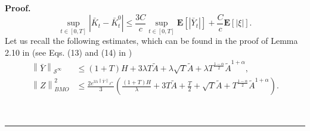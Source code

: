 \documentclass[10pt]{article}%
\numberwithin{equation}{section}
\newenvironment{proof}[1][Proof]{\noindent \textbf{#1.} }{\  \rule{0.5em}{0.5em}}
\def \E{\mathbf{E}}
\begin{document}
\begin{proof}
\begin{equation}
	\sup_{t \in[0, T]}\left|\bar{K}_{t}-\bar{K}^0_{t}\right|
	\leq \frac{3C}{c}\sup_{t \in[0, T]}\mathbf{E}[|\bar{Y}_t|]+\frac{C}{c}\E[|\xi|].
\end{equation}
Let us recall the following estimates, which can be found in the proof of Lemma 2.10 in \cite{LP} (see Eqs. (13) and (14) in \cite{LP})  
\begin{equation}\label{barYZ}\begin{split}
\left\|\bar{Y}\right\|_{\mathcal{S}^{\infty}}%
&\leq (1+T)H+3\lambda T \tilde{A}+\lambda\sqrt{T} \tilde{A}+\lambda T^{\frac{1-\alpha}{2}} \tilde{A}^{1+\alpha},\\
\left\|Z\right\|_{BMO}^2%
&\leq \frac{2 e^{3\lambda\left\|\bar{Y}\right\|_{\mathcal{S}^{\infty}}}}{3}\left(\frac{(1+T)H}{\lambda}+3 T \tilde{A}+\frac{T}{2} +\sqrt{T}\tilde{A}+T^{\frac{1-\alpha}{2}}\tilde{A}^{1+\alpha}\right).
\end{split}\end{equation}


\end{proof}
\end{document}
